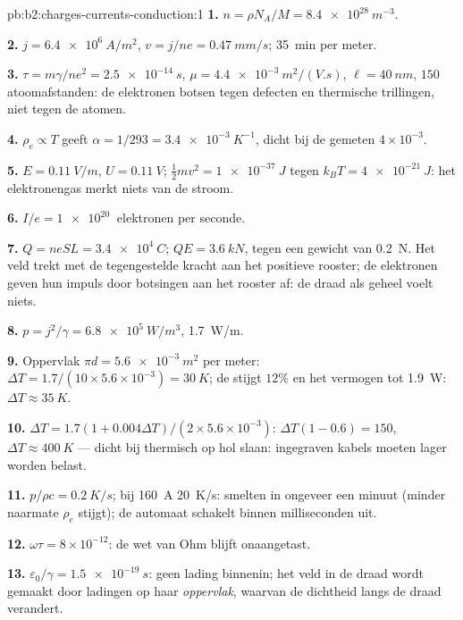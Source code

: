 \begin{solution}{pb:b2:charges-currents-conduction:1}
\textbf{1.} $n = \rho N_A/M = \qty{8.4e28}{m^{-3}}$.

\textbf{2.} $j = \qty{6.4e6}{A/m^2}$, $v = j/ne = \qty{0.47}{mm/s}$;
\qty{35}{min} per meter.

\textbf{3.} $\tau = m\gamma/ne^2 = \qty{2.5e-14}{s}$,
$\mu = \qty{4.4e-3}{m^2/(V.s)}$, $\ell =
\qty{40}{nm}$, $150$
atoomafstanden: de elektronen botsen tegen defecten en thermische
trillingen, niet tegen de atomen.

\textbf{4.} $\rho_e \propto T$ geeft
$\alpha = 1/293 = \qty{3.4e-3}{K^{-1}}$, dicht bij de gemeten
$4 \times 10^{-3}$.

\textbf{5.} $E = \qty{0.11}{V/m}$, $U = \qty{0.11}{V}$;
$\tfrac12mv^2 = \qty{1e-37}{J}$ tegen $k_BT = \qty{4e-21}{J}$: het
elektronengas merkt niets van de stroom.

\textbf{6.} $I/e = \qty{1e20}{}$ elektronen per seconde.

\textbf{7.} $Q = neSL = \qty{3.4e4}{C}$; $QE = \qty{3.6}{kN}$, tegen een
gewicht van \qty{0.2}{N}. Het veld trekt met de tegengestelde kracht aan het
positieve rooster; de elektronen geven hun impuls door botsingen aan het
rooster af: de draad als geheel voelt niets.

\textbf{8.} $p = j^2/\gamma = \qty{6.8e5}{W/m^3}$, \qty{1.7}{W/m}.

\textbf{9.} Oppervlak $\pi d = \qty{5.6e-3}{m^2}$ per meter:
$\Delta T = 1.7/(10 \times 5.6 \times
10^{-3}) = \qty{30}{K}$; de
 stijgt $12\%$ en het vermogen tot \qty{1.9}{W}:
$\Delta T \approx \qty{35}{K}$.

\textbf{10.}
$\Delta T = 1.7(1 + 0.004\Delta T)/(2 \times 5.6 \times 10^{-3})$:
$\Delta T(1 - 0.6) = 150$, $\Delta T \approx \qty{400}{K}$ --- dicht bij
thermisch op hol slaan: ingegraven kabels moeten lager worden belast.

\textbf{11.} $p/\rho c = \qty{0.2}{K/s}$; bij \qty{160}{A} \qty{20}{K/s}:
smelten in ongeveer een minuut (minder naarmate $\rho_e$ stijgt); de
automaat schakelt binnen milliseconden uit.

\textbf{12.} $\omega\tau = 8 \times 10^{-12}$: de wet van Ohm blijft onaangetast.

\textbf{13.} $\varepsilon_0/\gamma = \qty{1.5e-19}{s}$: geen lading
binnenin; het veld in de draad wordt gemaakt door ladingen op haar
\emph{oppervlak}, waarvan de dichtheid langs de draad verandert.


\end{solution}
